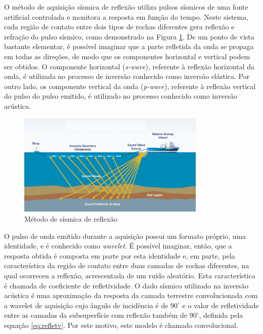 O método de aquisição sísmica de reflexão utiliza
pulsos sísmicos de uma fonte artificial controlada e monitora a resposta em
função do tempo. Neste sistema, cada região de contato entre dois tipos de rochas
diferentes gera reflexão e refração do pulso sísmico, como demonstrado na Figura
\ref{fig:1sismica}.
De um ponto de vista bastante elementar, é possível imaginar que a parte refletida da onda se
propaga em todas as direções, de modo que os componentes horizontal e vertical podem ser obtidos.
O componente horizontal (\textit{s-wave}), referente à reflexão horizontal
da onda, é utilizada no processo de inversão conhecido como inversão elástica. Por outro lado, os componente
vertical da onda (\textit{p-wave}), referente à reflexão vertical do pulso do pulso emitido, é utilizado no processo
conhecido como inversão acústica.

\begin{figure}[ht!]
\begin{center}
  \includegraphics[width=0.8\textwidth]{fig/seismic_survey}
  \caption{Método de sísmica de reflexão \citep{figsismica}}
  \label{fig:1sismica}
\end{center}
\end{figure}

O pulso de onda emitido durante a aquisição possui um formato próprio, uma identidade, e
é conhecido como \textit{wavelet}. É possível imaginar, então, que a resposta obtida
é composta em parte por esta identidade e, em parte, pela característica da região de contato
entre duas camadas de rochas diferentes, na qual ocorreceu a reflexão, acrescentada de um ruído aleatório. Esta característica
é chamada de coeficiente de refletividade.
O dado sísmico utilizado na inversão acústica é uma aproximação da resposta da camada terrestre convolucionada com
a wavelet de aquisição cujo ângulo de incidência é de $90^\circ$ e o valor de refletividade entre as camadas da subsuperfície
com reflexão também de $90^\circ$, definida pela equação \ref{eq:refletv}. Por este motivo, este modelo é chamado convolucional.

